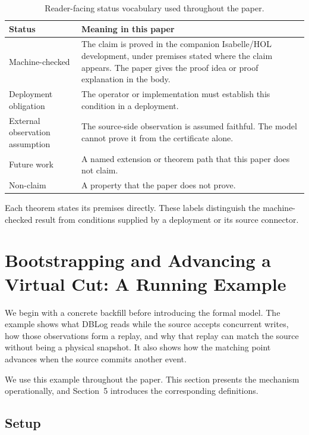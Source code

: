 \documentclass[letterpaper,10pt,twocolumn]{article}
\begin{document}
\begin{table}[t]
\caption{Reader-facing status vocabulary used throughout the paper.}
\label{tab:status-vocab}
\centering\small
\begin{tabularx}{\textwidth}{@{}lY@{}}
\toprule
\textbf{Status} & \textbf{Meaning in this paper}\\
\midrule
Machine-checked &
  The claim is proved in the companion Isabelle/HOL development, under
  premises stated where the claim appears. The paper gives the proof
  idea or proof explanation in the body.\\
Deployment obligation &
  The operator or implementation must establish this condition in a
  deployment.\\
External observation assumption &
  The source-side observation is assumed faithful. The model cannot
  prove it from the certificate alone.\\
Future work &
  A named extension or theorem path that this paper does not claim.\\
Non-claim &
  A property that the paper does not prove.\\
\bottomrule
\end{tabularx}
\end{table}

Each theorem states its premises directly. These labels distinguish the
machine-checked result from conditions supplied by a deployment or its
source connector.

\section{Bootstrapping and Advancing a Virtual Cut: A Running
Example}\label{bootstrapping-and-advancing-a-virtual-cut}

We begin with a concrete backfill before introducing the formal model.
The example shows what DBLog reads while the source accepts concurrent
writes, how those observations form a replay, and why that replay can
match the source without being a physical snapshot. It also shows how
the matching point advances when the source commits another event.

We use this example throughout the paper. This section presents the
mechanism operationally, and Section~5 introduces the corresponding
definitions.

\subsection{Setup}\label{setup}
\end{document}

